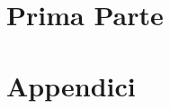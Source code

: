 \documentclass[11pt,a4paper,oneside,english,italian]{book}
\theoremstyle{plain}
\theoremstyle{definition}
\theoremstyle{remark}
\begin{document}
\part{Prima Parte}



\part{Appendici}

\renewcommand{\thesection}{\Alph{chapter}.\arabic{section}}

\begin{appendices}

\end{appendices}

\backmatter

\nocite{*}



\end{document}
